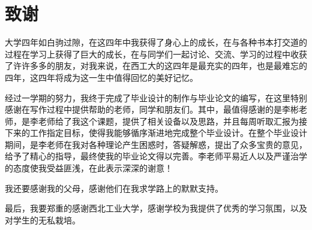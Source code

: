\chapter{致谢}
	\par 大学四年如白驹过隙，在这四年中我获得了身心上的成长，在与各种书本打交道的过程在学习上获得了巨大的成长，在与同学们一起讨论、交流、学习的过程中收获了许许多多的朋友，对我来说，在西工大的这四年是最充实的四年，也是最难忘的四年，这四年将成为这一生中值得回忆的美好记忆。
	\par 经过一学期的努力，我终于完成了毕业设计的制作与毕业论文的编写，在这里特别感谢在写作过程中提供帮助的老师，同学和朋友们。其中，最值得感谢的是李彬老师，是李老师给了我这个课题，提供了相关设备以及思路，并且每周听取汇报为接下来的工作指定目标，使得我能够循序渐进地完成整个毕业设计。在整个毕业设计期间，是李老师在我对各种理论产生困惑时，答疑解惑，提出了众多宝贵的意见，给予了精心的指导，最终使我的毕业论文得以完善。李老师平易近人以及严谨治学的态度使我受益匪浅，在此表示深深的谢意！
	\par 我还要感谢我的父母，感谢他们在我求学路上的默默支持。
	\par 最后，我要郑重的感谢西北工业大学，感谢学校为我提供了优秀的学习氛围，以及对学生的无私栽培。